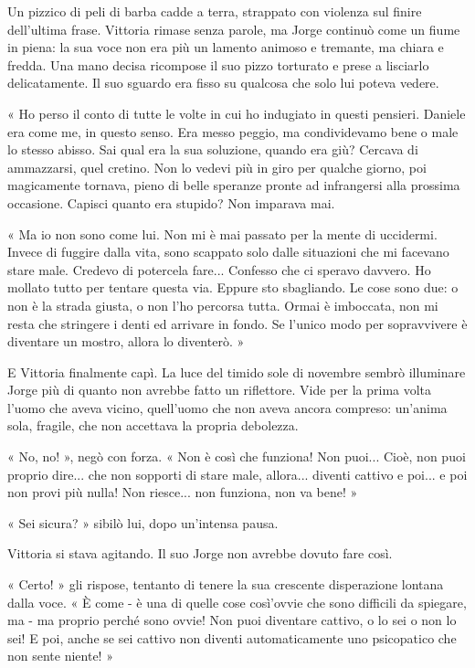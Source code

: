 Un pizzico di peli di barba cadde a terra, strappato con violenza sul finire dell'ultima frase. Vittoria rimase senza parole, ma Jorge continuò come un fiume in piena: la sua voce non era più un lamento animoso e tremante, ma chiara e fredda. Una mano decisa ricompose il suo pizzo torturato e prese a lisciarlo delicatamente. Il suo sguardo era fisso su qualcosa che solo lui poteva vedere.

« Ho perso il conto di tutte le volte in cui ho indugiato in questi pensieri. Daniele era come me, in questo senso. Era messo peggio, ma condividevamo bene o male lo stesso abisso. Sai qual era la sua soluzione, quando era giù? Cercava di ammazzarsi, quel cretino. Non lo vedevi più in giro per qualche giorno, poi magicamente tornava, pieno di belle speranze pronte ad infrangersi alla prossima occasione. Capisci quanto era stupido? Non imparava mai.

« Ma io non sono come lui. Non mi è mai passato per la mente di uccidermi. Invece di fuggire dalla vita, sono scappato solo dalle situazioni che mi facevano stare male. Credevo di potercela fare... Confesso che ci speravo davvero. Ho mollato tutto per tentare questa via. Eppure sto sbagliando. Le cose sono due: o non è la strada giusta, o non l'ho percorsa tutta. Ormai è imboccata, non mi resta che stringere i denti ed arrivare in fondo. Se l'unico modo per sopravvivere è diventare un mostro, allora lo diventerò. »

E Vittoria finalmente capì. La luce del timido sole di novembre sembrò illuminare Jorge più di quanto non avrebbe fatto un riflettore. Vide per la prima volta l'uomo che aveva vicino, quell'uomo che non aveva ancora compreso: un'anima sola, fragile, che non accettava la propria debolezza.

« No, no! », negò con forza. « Non è così che funziona! Non puoi... Cioè, non puoi proprio dire... che non sopporti di stare male, allora... diventi cattivo e poi... e poi non provi più nulla! Non riesce... non funziona, non va bene! »

« Sei sicura? » sibilò lui, dopo un'intensa pausa.

Vittoria si stava agitando. Il suo Jorge non avrebbe dovuto fare così.

« Certo! » gli rispose, tentanto di tenere la sua crescente disperazione lontana dalla voce. « È come - è una di quelle cose così'ovvie che sono difficili da spiegare, ma - ma proprio perché sono ovvie! Non puoi diventare cattivo, o lo sei o non lo sei! E poi, anche se sei cattivo non diventi automaticamente uno psicopatico che non sente niente! »

